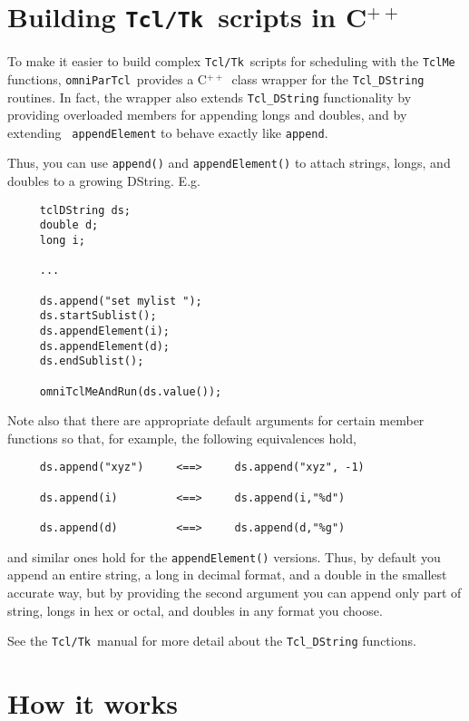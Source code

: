 \documentclass[11pt]{article}
\def\omniParTcl{{\tt omniParTcl}}
\def\tcltk{{\tt Tcl/Tk}}
\def\CXX{\relax C$^{++}$\relax}
\begin{document}
\section{Building \tcltk\ scripts in \CXX}

To make it easier to build complex \tcltk\ scripts for scheduling
with the {\tt TclMe} functions, \omniParTcl\ provides a \CXX\ class
wrapper for the {\tt Tcl\_DString} routines.  In fact, the wrapper also
extends {\tt Tcl\_DString} functionality by providing overloaded
members for appending longs and doubles, and by extending {\tt
appendElement} to behave exactly like {\tt append}.

Thus, 
you can use {\tt append()} and {\tt appendElement()} to
attach strings, longs, and doubles to a growing DString.  E.g.

\begin{verbatim}
     tclDString ds;
     double d;
     long i;

     ...

     ds.append("set mylist ");
     ds.startSublist();
     ds.appendElement(i);
     ds.appendElement(d);
     ds.endSublist();

     omniTclMeAndRun(ds.value());
\end{verbatim}

Note also that there are appropriate default arguments for certain
member functions so that, for example, the following equivalences
hold,

\begin{verbatim}
     ds.append("xyz")     <==>     ds.append("xyz", -1)

     ds.append(i)         <==>     ds.append(i,"%d")  

     ds.append(d)         <==>     ds.append(d,"%g")
\end{verbatim}

\noindent
and similar ones hold for the {\tt appendElement()} versions.  Thus, by
default you append an entire string, a long in decimal format, and a
double in the smallest accurate way, but by providing the second
argument you can append only part of string, longs in hex or octal, and
doubles in any format you choose.

See the \tcltk\ manual for more detail about the {\tt Tcl\_DString} functions.

\section{How it works}
\end{document}
